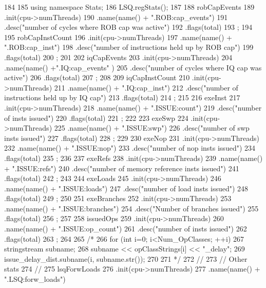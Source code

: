 \begin{DoxyCode}
184 {
185     using namespace Stats;
186     LSQ.regStats();
187 
188     robCapEvents
189         .init(cpu->numThreads)
190         .name(name() + ".ROB:cap_events")
191         .desc("number of cycles where ROB cap was active")
192         .flags(total)
193         ;
194 
195     robCapInstCount
196         .init(cpu->numThreads)
197         .name(name() + ".ROB:cap_inst")
198         .desc("number of instructions held up by ROB cap")
199         .flags(total)
200         ;
201 
202     iqCapEvents
203         .init(cpu->numThreads)
204         .name(name() +".IQ:cap_events" )
205         .desc("number of cycles where IQ cap was active")
206         .flags(total)
207         ;
208 
209     iqCapInstCount
210         .init(cpu->numThreads)
211         .name(name() + ".IQ:cap_inst")
212         .desc("number of instructions held up by IQ cap")
213         .flags(total)
214         ;
215 
216     exeInst
217         .init(cpu->numThreads)
218         .name(name() + ".ISSUE:count")
219         .desc("number of insts issued")
220         .flags(total)
221         ;
222 
223     exeSwp
224         .init(cpu->numThreads)
225         .name(name() + ".ISSUE:swp")
226         .desc("number of swp insts issued")
227         .flags(total)
228         ;
229 
230     exeNop
231         .init(cpu->numThreads)
232         .name(name() + ".ISSUE:nop")
233         .desc("number of nop insts issued")
234         .flags(total)
235         ;
236 
237     exeRefs
238         .init(cpu->numThreads)
239         .name(name() + ".ISSUE:refs")
240         .desc("number of memory reference insts issued")
241         .flags(total)
242         ;
243 
244     exeLoads
245         .init(cpu->numThreads)
246         .name(name() + ".ISSUE:loads")
247         .desc("number of load insts issued")
248         .flags(total)
249         ;
250 
251     exeBranches
252         .init(cpu->numThreads)
253         .name(name() + ".ISSUE:branches")
254         .desc("Number of branches issued")
255         .flags(total)
256         ;
257 
258     issuedOps
259         .init(cpu->numThreads)
260         .name(name() + ".ISSUE:op_count")
261         .desc("number of insts issued")
262         .flags(total)
263         ;
264 
265 /*
266     for (int i=0; i<Num_OpClasses; ++i) {
267         stringstream subname;
268         subname << opClassStrings[i] << "_delay";
269         issue_delay_dist.subname(i, subname.str());
270     }
271 */
272     //
273     //  Other stats
274     //
275     lsqForwLoads
276         .init(cpu->numThreads)
277         .name(name() + ".LSQ:forw_loads")
}
\end{DoxyCode}
